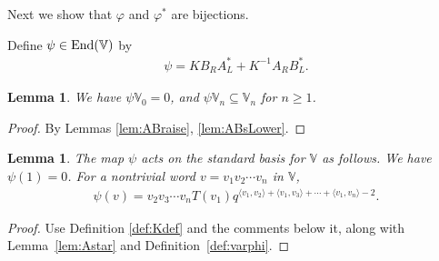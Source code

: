 \documentclass[pdftex]{sigma}
\numberwithin{equation}{section}
\newtheorem{Lemma}[Theorem]{Lemma}
\begin{document}
Next we show that $\varphi$ and $\varphi^*$ are bijections.

\begin{Definition}\label{def:varphi} Define $\psi \in {\rm End}(\mathbb V)$ by
\begin{gather}\label{eq:varphi}
\psi = K B_R A^*_L + K^{-1} A_R B^*_L.
\end{gather}
\end{Definition}

\begin{Lemma}We have $\psi \mathbb V_0=0$, and $\psi \mathbb V_n \subseteq \mathbb V_n$ for $n \geq 1$.
\end{Lemma}
\begin{proof} By Lemmas \ref{lem:ABraise}, \ref{lem:ABsLower}.
\end{proof}

\begin{Lemma}\label{lem:varphiAct} The map $\psi $ acts on the standard basis for $\mathbb V$ as follows. We have $\psi(1)=0$. For a nontrivial word $v=v_1 v_2 \cdots v_n$ in $\mathbb V$,
\begin{gather*}
\psi(v) = v_2 v_3 \cdots v_n T(v_1)q^{\langle v_1, v_2\rangle+\langle v_1, v_3\rangle+\cdots + \langle v_1, v_n\rangle-2}.
\end{gather*}
\end{Lemma}
\begin{proof} Use Definition \ref{def:Kdef} and the comments below it, along with Lemma~\ref{lem:Astar} and Definition~\ref{def:varphi}.
\end{proof}
\end{document}
